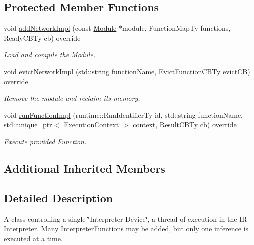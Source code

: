 \subsection*{Protected Member Functions}
\begin{DoxyCompactItemize}
\item 
void \hyperlink{classglow_1_1runtime_1_1_interpreter_device_manager_acb6a52ac1d6b704796f52da6c26d2774}{add\+Network\+Impl} (const \hyperlink{classglow_1_1_module}{Module} $\ast$module, Function\+Map\+Ty functions, Ready\+C\+B\+Ty cb) override
\begin{DoxyCompactList}\small\item\em Load and compile the \hyperlink{classglow_1_1_module}{Module}. \end{DoxyCompactList}\item 
\mbox{\label{classglow_1_1runtime_1_1_interpreter_device_manager_a3c3a19ad225d7310b6a21f0411ce683c}} 
void \hyperlink{classglow_1_1runtime_1_1_interpreter_device_manager_a3c3a19ad225d7310b6a21f0411ce683c}{evict\+Network\+Impl} (std\+::string function\+Name, Evict\+Function\+C\+B\+Ty evict\+CB) override
\begin{DoxyCompactList}\small\item\em Remove the module and reclaim its memory. \end{DoxyCompactList}\item 
\mbox{\label{classglow_1_1runtime_1_1_interpreter_device_manager_abc5651aafe034e073e6244224bd20070}} 
void \hyperlink{classglow_1_1runtime_1_1_interpreter_device_manager_abc5651aafe034e073e6244224bd20070}{run\+Function\+Impl} (runtime\+::\+Run\+Identifier\+Ty id, std\+::string function\+Name, std\+::unique\+\_\+ptr$<$ \hyperlink{classglow_1_1_execution_context}{Execution\+Context} $>$ context, Result\+C\+B\+Ty cb) override
\begin{DoxyCompactList}\small\item\em Execute provided \hyperlink{classglow_1_1_function}{Function}. \end{DoxyCompactList}\end{DoxyCompactItemize}
\subsection*{Additional Inherited Members}


\subsection{Detailed Description}
A class controlling a single \char`\"{}\+Interpreter Device\char`\"{}, a thread of execution in the I\+R-\/\+Interpreter. Many Interpreter\+Functions may be added, but only one inference is executed at a time. 

